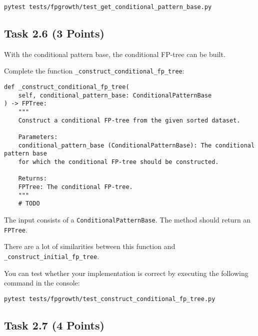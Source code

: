\documentclass[
english,
smallborders
]{i6prcsht}
\newcommand{\points}[1]{\hfill \color{red}(#1 Points)\color{black}}
\begin{document}
\vspace*{0.3cm}

\begin{lstlisting}
pytest tests/fpgrowth/test_get_conditional_pattern_base.py
\end{lstlisting}

\vspace*{0.1cm}

\subsection*{Task 2.6 \points{3}}

With the conditional pattern base, the conditional FP-tree can be built.

Complete the function \texttt{\_construct\_conditional\_fp\_tree}:

\vspace*{0.3cm}

\begin{lstlisting}
def _construct_conditional_fp_tree(
	self, conditional_pattern_base: ConditionalPatternBase
) -> FPTree:
	"""
	Construct a conditional FP-tree from the given sorted dataset.

	Parameters:
	conditional_pattern_base (ConditionalPatternBase): The conditional pattern base
	for which the conditional FP-tree should be constructed.

	Returns:
	FPTree: The conditional FP-tree.
	"""
	# TODO
\end{lstlisting}

\vspace*{0.1cm}

The input consists of a \texttt{ConditionalPatternBase}. The method should return an \texttt{FPTree}.

There are a lot of similarities between this function and \texttt{\_construct\_initial\_fp\_tree}.

You can test whether your implementation is correct by executing the following command in the console:

\vspace*{0.3cm}

\begin{lstlisting}
pytest tests/fpgrowth/test_construct_conditional_fp_tree.py
\end{lstlisting}

\vspace*{0.1cm}

\subsection*{Task 2.7 \points{4}}
\end{document}
